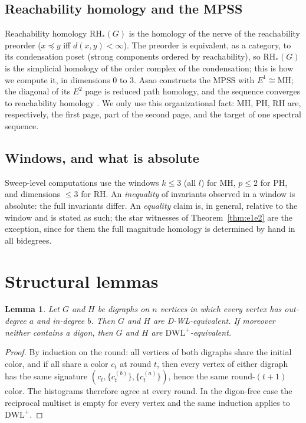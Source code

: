 \documentclass[pdflatex,sn-mathphys,Numbered]{sn-jnl}
\theoremstyle{thmstyleone}
\newtheorem{lemma}[theorem]{Lemma}
\theoremstyle{thmstyletwo}
\newcommand{\MH}{\mathrm{MH}}
\newcommand{\PH}{\mathrm{PH}}
\newcommand{\RH}{\mathrm{RH}}
\newcommand{\dwlp}{\mathrm{DWL}^{+}}
\begin{document}
\subsection{Reachability homology and the MPSS}

Reachability homology $\RH_\ast(G)$ \cite{HepworthRoffIMRN} is the
homology of the nerve of the reachability preorder ($x \preceq y$ iff
$d(x,y) < \infty$). The preorder is equivalent, as a category, to its
condensation poset (strong components ordered by reachability), so
$\RH_\ast(G)$ is the simplicial homology of the order complex of the
condensation; this is how we compute it, in dimensions $0$ to $3$.
Asao \cite{Asao23} constructs the MPSS with $E^1 \cong \MH$; the diagonal
of its $E^2$ page is reduced path homology, and the sequence converges to
reachability homology \cite{HepworthRoff24,HepworthRoffIMRN}. We only use
this organizational fact: $\MH$, $\PH$, $\RH$ are, respectively, the
first page, part of the second page, and the target of one spectral
sequence.

\subsection{Windows, and what is absolute}\label{subsec:windows}

Sweep-level computations use the windows $k \le 3$ (all $l$) for $\MH$,
$p \le 2$ for $\PH$, and dimensions $\le 3$ for $\RH$. An
\emph{inequality} of invariants observed in a window is absolute: the
full invariants differ. An \emph{equality} claim is, in general, relative
to the window and is stated as such; the star witnesses of
Theorem~\ref{thm:e1e2} are the exception, since for them the full
magnitude homology is determined by hand in all bidegrees.

\section{Structural lemmas}\label{sec:lemmas}

\begin{lemma}\label{lem:regular}
Let $G$ and $H$ be digraphs on $n$ vertices in which every vertex has
out-degree $a$ and in-degree $b$. Then $G$ and $H$ are D-WL-equivalent.
If moreover neither contains a digon, then $G$ and $H$ are
$\dwlp$-equivalent.
\end{lemma}

\begin{proof}
By induction on the round: all vertices of both digraphs share the
initial color, and if all share a color $c_t$ at round $t$, then every
vertex of either digraph has the same signature
$(c_t, \{c_t^{(b)}\}, \{c_t^{(a)}\})$, hence the same round-$(t{+}1)$
color. The histograms therefore agree at every round. In the digon-free
case the reciprocal multiset is empty for every vertex and the same
induction applies to $\dwlp$.
\end{proof}
\end{document}

